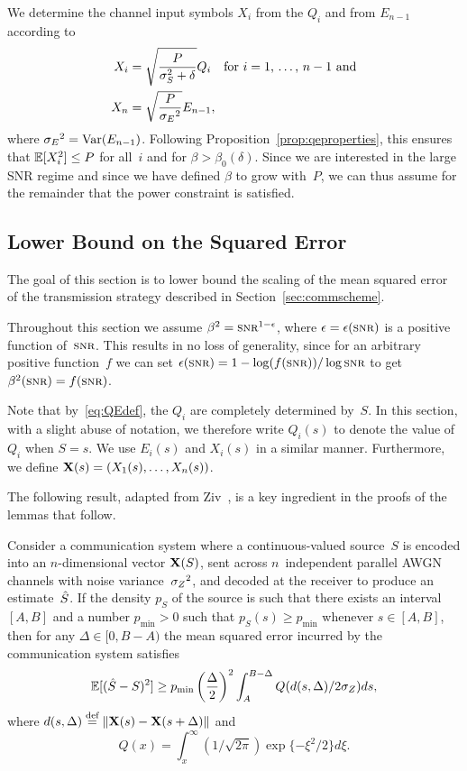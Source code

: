 We determine the channel input symbols $X_i$ from the $Q_i$ and from $E_{n-1}$
according to 
\begin{align}
  X_i &= \sqrt{\frac{P}{{\sigma_S^2} + \delta}} Q_i \quad
  \text{for $i = 1$, \dots, $n-1$ and} \nonumber\\
  X_n &= \sqrt{\frac{P}{{{\sigma_E}^2}}} E_{n-1},
  \label{eq:Xdef}
\end{align}
where ${{\sigma_E}^2} = \operatorname{Var}(E_{n-1})$.  Following Proposition~\ref{prop:qeproperties},
this ensures that $\mathbb{E}[X_i^2] \le P$ for all~$i$ and for $\beta >
\beta_0(\delta)$.  Since we are interested in the large SNR regime and since we
have defined $\beta$ to grow with~$P$, we can thus assume for the remainder that
the power constraint is satisfied. 


\subsection{Lower Bound on the Squared Error}\label{sec:scalarlowerbound}

The goal of this section is to lower bound the scaling of the mean squared error
of the transmission strategy described in Section~\ref{sec:commscheme}.

Throughout this section we assume $\beta^2 = \snr^{1-\e}$, where $\e = \e(\snr)$
is a positive function of~$\snr$. This results in no loss of generality, since
for an arbitrary positive function~$f$ we can set $\e(\snr) =
1-\log(f(\snr))/\log\snr$ to get $\beta^2(\snr) = f(\snr)$.

Note that by~\eqref{eq:QEdef}, the $Q_i$ are completely determined by~$S$.
In this section, with a slight abuse of notation, we therefore write $Q_i(s)$ to
denote the value of~$Q_i$ when $S = s$. We use $E_i(s)$ and $X_i(s)$ in a
similar manner. Furthermore, we define $\mathbf{X}(s) = (X_1(s), \dots, X_n(s))$.

The following result, adapted from Ziv~\cite{Ziv1970}, is a key ingredient in
the proofs of the lemmas that follow.

\begin{lemma}
  \label{lem:zivbound}
  \label{LEM:ZIVBOUND}
  Consider a communication system where a con\-tin\-u\-ous-valued source~$S$ is
  encoded into an $n$-dimensional vector $\mathbf{X}(S)$, sent across $n$~independent
  parallel AWGN channels with noise variance~${{\sigma_Z}^2}$, and decoded at the receiver
  to produce an estimate~${\hat{S}}$.  If the density $p_S$ of the source is such that
  there exists an interval $[A,B]$ and a number $p_{\min} > 0$ such that $p_S(s)
  \ge p_{\min}$ whenever $s \in [A,B]$, then for any $\Delta \in [0,B-A)$ the
  mean squared error incurred by the communication system satisfies
  \begin{equation}
    \label{eq:zivbound}
    \mathbb{E}[({\hat{S}} - S)^2] \ge p_{\min} \left(\frac{\Delta}{2} \right)^2 
    \int_A^{B-\Delta} Q(d(s, \Delta) / 2 {\sigma_Z}) ds,
  \end{equation}
  where $d(s, \Delta) \stackrel{\text{def}}{=} \|\mathbf{X}(s) - \mathbf{X}(s+\Delta)\|$ and 
  \[Q(x) = \int_x^{\infty} (1/\sqrt{2\pi}) \exp\{-\xi^2/2\} d\xi.\]
\end{lemma}

